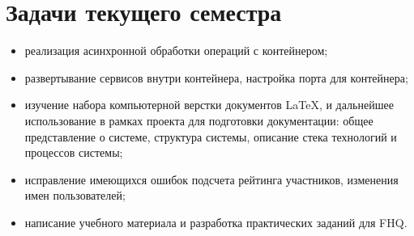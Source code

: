 \section{Задачи текущего семестра}

\begin{itemize}
\item реализация асинхронной обработки операций с контейнером;
\item развертывание сервисов внутри контейнера, настройка порта для контейнера;
\item изучение набора компьютерной верстки документов \LaTeX, и дальнейшее использование в рамках проекта для подготовки документации: общее представление о системе, структура системы, описание стека технологий и процессов системы;
\item исправление имеющихся ошибок подсчета рейтинга участников, изменения имен пользователей;
\item написание учебного материала и разработка практических заданий для FHQ.
\end{itemize}
\clearpage
